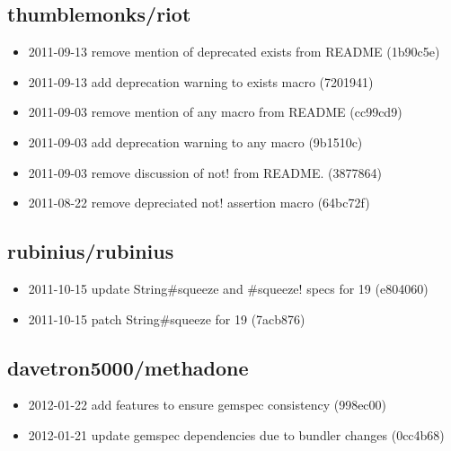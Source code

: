 \documentclass{article}
\begin{document}
\begin{multicols}{2}
  \begin{raggedright}
  \subsection{thumblemonks/riot} %
  \label{sub:thumblemonks/riot}

  \begin{itemize}
    \item2011-09-13 remove mention of deprecated exists from README (1b90c5e)
    \item2011-09-13 add deprecation warning to exists macro (7201941)
    \item2011-09-03 remove mention of any macro from README (cc99cd9)
    \item2011-09-03 add deprecation warning to any macro (9b1510c)
    \item2011-09-03 remove discussion of not! from README. (3877864)
    \item2011-08-22 remove depreciated not! assertion macro (64bc72f)
  \end{itemize}

  \subsection{rubinius/rubinius} %
  \label{sub:rubinius/rubinius}

  \begin{itemize}
    \item2011-10-15 update String\#squeeze and \#squeeze! specs for 19 (e804060)
    \item2011-10-15 patch String\#squeeze for 19 (7acb876)
  \end{itemize}
  
  \subsection{davetron5000/methadone} %
  \label{sub:davetron5000/methadone}
  
  \begin{itemize}
    \item2012-01-22 add features to ensure gemspec consistency (998ec00)
    \item2012-01-21 update gemspec dependencies due to bundler changes (0cc4b68)
  \end{itemize}

  \end{raggedright}
\end{multicols}

\end{document}
